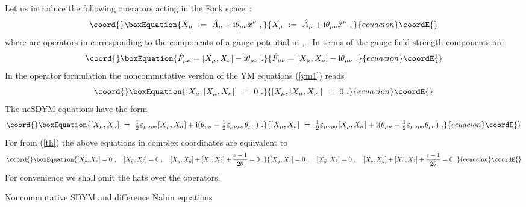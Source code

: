 \documentclass[a4paper,11pt]{article}
\makeatletter
\renewcommand{\section}{\@startsection{section}{1}{0pt}{\medskipamount}
{\medskipamount}{\large\bf}}
\numberwithin{equation}{section}
\def\th{\theta}
\def\de{\delta}
\def\e{\epsilon}
\def\ve{\varepsilon}
\def\s{\sigma}
\def\sfrac#1#2{{\textstyle\frac{#1}{#2}}}
\def\m{\mu}
\def\n{\nu}
\providecommand{\im}{\mathrm{i}}
\providecommand{\zb}{{\bar{z}}}
\providecommand{\yb}{{\bar{y}}}
\providecommand{\rc}{{\mathbb{R}^4}}
\providecommand{\Hcal}{{\cal H}}
\makeatother
\begin{document}
Let us introduce the following operators acting in the Fock space~\myHighlight{$\Hcal$}\coordHE{}:
\begin{equation}\coord{}\boxEquation{ \label{X}
X_\mu \ :=\ \hat A_\mu + \im\th_{\mu\nu} \hat x^\nu\ ,
}{ X_\mu \ :=\ \hat A_\mu + \im\th_{\mu\nu} \hat x^\nu\ ,
}{ecuacion}\coordE{}\end{equation}
where \coordHE{} are operators in \myHighlight{$\Hcal$}\coordHE{} corresponding to the 
components \coordHE{} of a
gauge potential \coordHE{} in \myHighlight{$\rc$}\coordHE{}, \myHighlight{$\th_{\mu\s}\th^{\s\nu}=\de_{\mu}^{\nu}$}\coordHE{}.
In terms of \coordHE{} the gauge field strength components are
\begin{equation}\coord{}\boxEquation{ \label{ncF} 
\hat F_{\mu\nu}= [X_\mu ,X_\nu ] - \im \th_{\mu\nu}\ . 
}{ \hat F_{\mu\nu}= [X_\mu ,X_\nu ] - \im \th_{\mu\nu}\ . 
}{ecuacion}\coordE{}\end{equation} 
In the operator formulation the noncommutative version of the YM equations 
(\ref{ym1}) reads
\begin{equation}\coord{}\boxEquation{ \label{ncym1}
[X_\mu , [X_\mu , X_\nu ]]\ =\ 0\ .
}{ [X_\mu , [X_\mu , X_\nu ]]\ =\ 0\ .
}{ecuacion}\coordE{}\end{equation}
The ncSDYM equations have the form
\begin{equation}\coord{}\boxEquation{ \label{ncsdym1}
[X_\mu , X_\nu ]\ =\ \sfrac{1}{2}\ve_{\mu\nu\rho\s} [X_\rho , X_\s ] + 
\im(\th_{\m\n} - \sfrac{1}{2}\ve_{\mu\nu\rho\s}\th_{\rho\s} )  \ . 
}{ [X_\mu , X_\nu ]\ =\ \sfrac{1}{2}\ve_{\mu\nu\rho\s} [X_\rho , X_\s ] + 
\im(\th_{\m\n} - \sfrac{1}{2}\ve_{\mu\nu\rho\s}\th_{\rho\s} )  \ . 
}{ecuacion}\coordE{}\end{equation}
For \myHighlight{$\th^{\m\n}$}\coordHE{} from (\ref{th}) the above equations in complex coordinates 
are equivalent to
\begin{equation}\coord{}\boxEquation{ \label{ncsdym2}
[X_{y}, X_{z} ]=0\ , \quad
[X_{\yb}, X_{\zb} ]=0\ , \quad  [X_{y}, X_{\yb}]+ [X_{z}, X_{\zb} ] + \frac{\e -1}{2\th}=0\ .
}{ [X_{y}, X_{z} ]=0\ , \quad
[X_{\yb}, X_{\zb} ]=0\ , \quad  [X_{y}, X_{\yb}]+ [X_{z}, X_{\zb} ] + \frac{\e -1}{2\th}=0\ .
}{ecuacion}\coordE{}\end{equation}
For convenience we shall omit the hats over the operators.

\medskip

\section{Noncommutative SDYM and difference Nahm equations}
\end{document}
